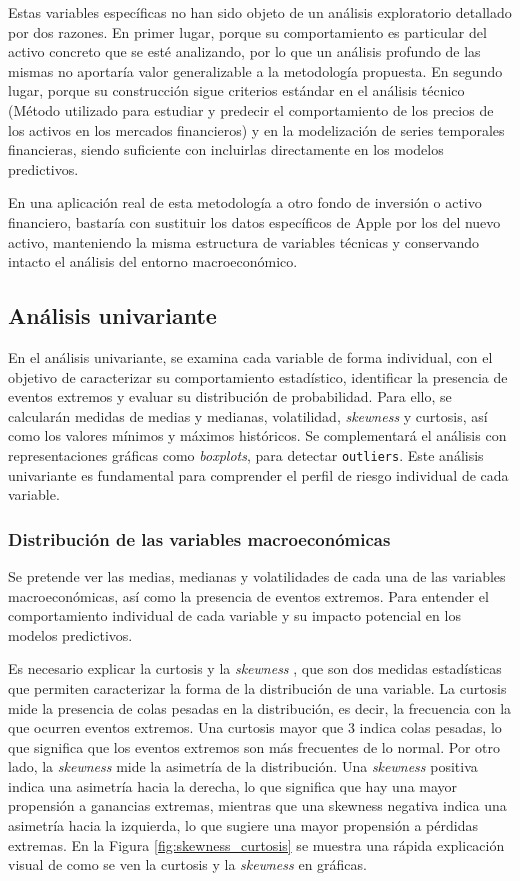 Estas variables específicas no han sido objeto de un análisis exploratorio detallado por dos razones. En primer lugar, porque su comportamiento es particular del activo concreto que se esté analizando, por lo que un análisis profundo de las mismas no aportaría valor generalizable a la metodología propuesta. En segundo lugar, porque su construcción sigue criterios estándar en el análisis técnico \cite{analisis_tecnico} (Método utilizado para estudiar y predecir el comportamiento de los precios de los activos en los mercados financieros) y en la modelización de series temporales financieras, siendo suficiente con incluirlas directamente en los modelos predictivos.

En una aplicación real de esta metodología a otro fondo de inversión o activo financiero, bastaría con sustituir los datos específicos de Apple por los del nuevo activo, manteniendo la misma estructura de variables técnicas y conservando intacto el análisis del entorno macroeconómico.

\subsection{Análisis univariante}
En el análisis univariante, se examina cada variable de forma individual, con el objetivo de caracterizar su comportamiento estadístico, identificar la presencia de eventos extremos y evaluar su distribución de probabilidad. Para ello, se calcularán medidas de medias y medianas, volatilidad, \emph{skewness} y curtosis, así como los valores mínimos y máximos históricos. Se complementará el análisis con representaciones gráficas como \emph{boxplots}, para detectar \texttt{outliers}. Este análisis univariante es fundamental para comprender el perfil de riesgo individual de cada variable.

\subsubsection{Distribución de las variables macroeconómicas}
Se pretende ver las medias, medianas y volatilidades de cada una de las variables macroeconómicas, así como la presencia de eventos extremos. Para entender el comportamiento individual de cada variable y su impacto potencial en los modelos predictivos.

Es necesario explicar la curtosis \cite{curtosis} y la \emph{skewness} \cite{skewness}, que son dos medidas estadísticas que permiten caracterizar la forma de la distribución de una variable. La curtosis mide la presencia de colas pesadas en la distribución, es decir, la frecuencia con la que ocurren eventos extremos. Una curtosis mayor que 3 indica colas pesadas, lo que significa que los eventos extremos son más frecuentes de lo normal. Por otro lado, la \emph{skewness} mide la asimetría de la distribución. Una \emph{skewness} positiva indica una asimetría hacia la derecha, lo que significa que hay una mayor propensión a ganancias extremas, mientras que una skewness negativa indica una asimetría hacia la izquierda, lo que sugiere una mayor propensión a pérdidas extremas. En la Figura \ref{fig:skewness_curtosis} se muestra una rápida explicación visual de como se ven la curtosis y la \emph{skewness} en gráficas.

